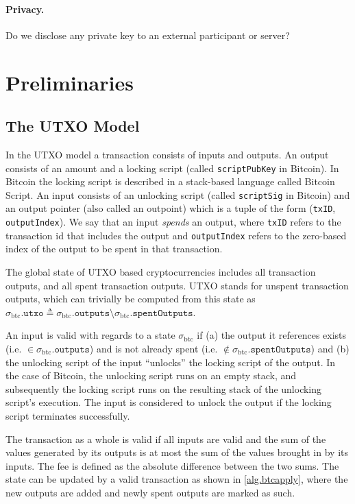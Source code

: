 \documentclass[sigconf,authordraft]{acmart}
\begin{document}
\paragraph{Privacy.} Do we disclose any private key to an external participant or server?

\section{Preliminaries}
\subsection{The UTXO Model}
In the UTXO model a transaction consists of inputs and outputs. An output consists of an amount and a locking script (called \texttt{scriptPubKey} in Bitcoin). In Bitcoin the locking script is described in a stack-based language called Bitcoin Script. An input consists of an unlocking script (called \texttt{scriptSig} in Bitcoin) and an output pointer (also called an outpoint) which is a tuple of the form (\texttt{txID}, \texttt{outputIndex}). We say that an input \emph{spends} an output, where \texttt{txID} refers to the transaction id that includes the output and \texttt{outputIndex} refers to the zero-based index of the output to be spent in that transaction.

\def\btcstate{\ensuremath{\sigma_\text{btc}}}
\def\btcapply{\text{apply}\textsubscript{btc}}
\def\outputs{\texttt{outputs}}
\def\inputs{\texttt{inputs}}
\def\spentOutputs{\texttt{spentOutputs}}
\def\utxo{\texttt{utxo}}
The global state of UTXO based cryptocurrencies includes all transaction outputs, and all spent transaction outputs. UTXO stands for unspent transaction outputs, which can trivially be computed from this state as $\btcstate.\utxo \triangleq \btcstate.\outputs \setminus \btcstate.\spentOutputs$.

An input is valid with regards to a state $\btcstate$ if (a) the output it references exists (i.e. $\in \btcstate.\outputs$) and is not already spent (i.e. $\notin \btcstate.\spentOutputs$) and (b) the unlocking script of the input ``unlocks'' the locking script of the output. In the case of Bitcoin, the unlocking script runs on an empty stack, and subsequently the locking script runs on the resulting stack of the unlocking script's execution. The input is considered to unlock the output if the locking script terminates successfully.

The transaction as a whole is valid if all inputs are valid and the sum of the values generated by its outputs is at most the sum of the values brought in by its inputs. The fee is defined as the absolute difference between the two sums. The state can be updated by a valid transaction as shown in \cref{alg.btcapply}, where the new outputs are added and newly spent outputs are marked as such.
\end{document}
